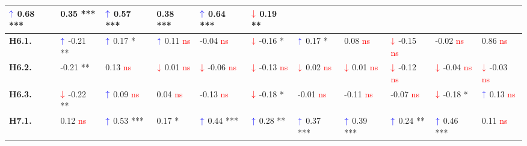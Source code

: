 \begin{table}[htpb]
{\begin{tabular}{|l|ll|ll|ll|ll|ll|}
  \multicolumn{1}{l|}{$\textcolor{blue}{\uparrow}$ 0.68 ***} &
  0.35 *** &
  \multicolumn{1}{l|}{$\textcolor{blue}{\uparrow}$ 0.57 ***} &
  0.38 *** &
  \multicolumn{1}{l|}{$\textcolor{blue}{\uparrow}$ 0.64 ***} &
  $\textcolor{red}{\downarrow}$ 0.19 ** \\ \hline
\textbf{H6.1.} &
  \multicolumn{1}{l|}{$\textcolor{blue}{\uparrow}$ -0.21 **} &
  $\textcolor{blue}{\uparrow}$ 0.17 * &
  \multicolumn{1}{l|}{$\textcolor{blue}{\uparrow}$ 0.11 \textcolor{red}{ns}} &
  -0.04 \textcolor{red}{ns} &
  \multicolumn{1}{l|}{$\textcolor{red}{\downarrow}$ -0.16 *} &
  $\textcolor{blue}{\uparrow}$ 0.17 * &
  \multicolumn{1}{l|}{0.08 \textcolor{red}{ns}} &
  $\textcolor{red}{\downarrow}$ -0.15 \textcolor{red}{ns} &
  \multicolumn{1}{l|}{-0.02 \textcolor{red}{ns}} &
  0.86 \textcolor{red}{ns} \\ \hline
\textbf{H6.2.} &
  \multicolumn{1}{l|}{-0.21 **} &
  0.13 \textcolor{red}{ns} &
  \multicolumn{1}{l|}{$\textcolor{red}{\downarrow}$ 0.01 \textcolor{red}{ns}} &
  $\textcolor{red}{\downarrow}$ -0.06 \textcolor{red}{ns} &
  \multicolumn{1}{l|}{$\textcolor{red}{\downarrow}$ -0.13 \textcolor{red}{ns}} &
  $\textcolor{red}{\downarrow}$ 0.02 \textcolor{red}{ns} &
  \multicolumn{1}{l|}{$\textcolor{red}{\downarrow}$ 0.01 \textcolor{red}{ns}} &
  $\textcolor{red}{\downarrow}$ -0.12 \textcolor{red}{ns} &
  \multicolumn{1}{l|}{$\textcolor{red}{\downarrow}$ -0.04 \textcolor{red}{ns}} &
  $\textcolor{red}{\downarrow}$ -0.03 \textcolor{red}{ns} \\ \hline
\textbf{H6.3.} &
  \multicolumn{1}{l|}{$\textcolor{red}{\downarrow}$ -0.22 **} &
  $\textcolor{blue}{\uparrow}$ 0.09 \textcolor{red}{ns} &
  \multicolumn{1}{l|}{0.04 \textcolor{red}{ns}} &
  -0.13 \textcolor{red}{ns} &
  \multicolumn{1}{l|}{$\textcolor{red}{\downarrow}$ -0.18 *} &
  -0.01 \textcolor{red}{ns} &
  \multicolumn{1}{l|}{-0.11 \textcolor{red}{ns}} &
  -0.07 \textcolor{red}{ns} &
  \multicolumn{1}{l|}{$\textcolor{red}{\downarrow}$ -0.18 *} &
  $\textcolor{blue}{\uparrow}$ 0.13 \textcolor{red}{ns} \\ \hline
\textbf{H7.1.} &
  \multicolumn{1}{l|}{0.12 \textcolor{red}{ns}} &
  $\textcolor{blue}{\uparrow}$ 0.53 *** &
  \multicolumn{1}{l|}{0.17 *} &
  $\textcolor{blue}{\uparrow}$ 0.44 *** &
  \multicolumn{1}{l|}{$\textcolor{blue}{\uparrow}$ 0.28 **} &
  $\textcolor{blue}{\uparrow}$ 0.37 *** &
  \multicolumn{1}{l|}{$\textcolor{blue}{\uparrow}$ 0.39 ***} &
  $\textcolor{blue}{\uparrow}$ 0.24 ** &
  \multicolumn{1}{l|}{$\textcolor{blue}{\uparrow}$ 0.46 ***} &
  0.11 \textcolor{red}{ns} \\ \hline

\end{tabular}}
\end{table}
